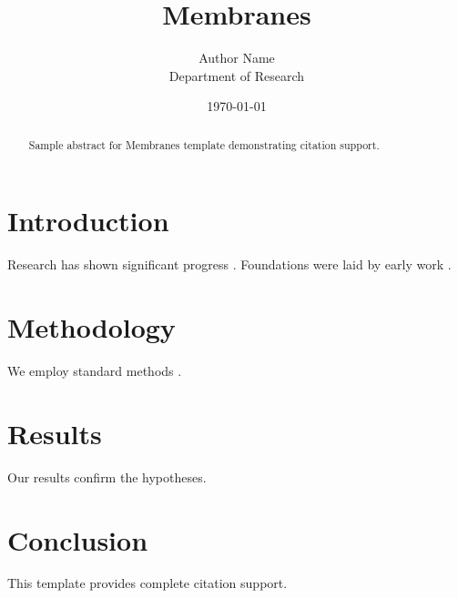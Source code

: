 \documentclass{mdpi}
\title{Membranes}
\author{Author Name \\ \small Department of Research}
\date{\today}
\begin{document}
\maketitle

\begin{abstract}
Sample abstract for Membranes template demonstrating citation support.
\end{abstract}

\section{Introduction}
Research has shown significant progress \citep{einstein1905}. Foundations were laid by early work \citep{turing1950}.

\section{Methodology}
We employ standard methods \citep{knuth1984}.

\section{Results}
Our results confirm the hypotheses.

\section{Conclusion}
This template provides complete citation support.



\end{document}
